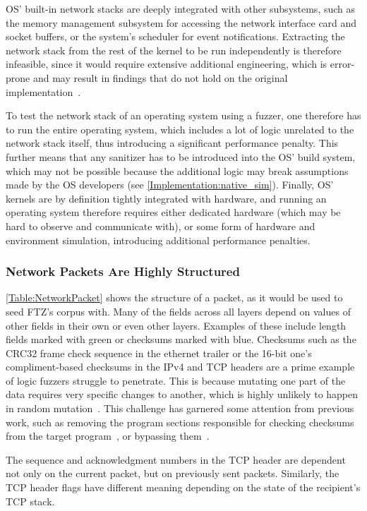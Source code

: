 \documentclass[twocolumn]{article}
\newcommand{\proj}{FTZ\xspace}
\let\savedCite=\cite
\renewcommand{\cite}{\unskip~\savedCite}
\begin{document}
OS' built-in network stacks are deeply integrated with other subsystems, such as the memory management subsystem for accessing the network interface card and socket buffers, or the system's scheduler for event notifications. Extracting the network stack from the rest of the kernel to be run independently is therefore infeasible, since it would require extensive additional engineering, which is error-prone and may result in findings that do not hold on the original implementation\cite{KernelVsUserNetworking}.

To test the network stack of an operating system using a fuzzer, one therefore has to run the entire operating system, which includes a lot of logic unrelated to the network stack itself, thus introducing a significant performance penalty. This further means that any sanitizer has to be introduced into the OS' build system, which may not be possible because the additional logic may break assumptions made by the OS developers (see \cref{Implementation:native_sim}). Finally, OS' kernels are by definition tightly integrated with hardware, and running an operating system therefore requires either dedicated hardware (which may be hard to observe and communicate with), or some form of hardware and environment simulation, introducing additional performance penalties.

\subsubsection{Network Packets Are Highly Structured}
\label{Background:TcpIsStructured}

\cref{Table:NetworkPacket} shows the structure of a packet, as it would be used to seed \proj's corpus with. Many of the fields across all layers depend on values of other fields in their own or even other layers. Examples of these include length fields marked with green or checksums marked with blue. Checksums such as the CRC32 frame check sequence in the ethernet trailer or the 16-bit one's compliment-based checksums in the IPv4 and TCP headers are a prime example of logic fuzzers struggle to penetrate. This is because mutating one part of the data requires very specific changes to another, which is highly unlikely to happen in random mutation\cite{StateOfTheArt}. This challenge has garnered some attention from previous work, such as removing the program sections responsible for checking checksums from the target program\cite{TFuzz}, or bypassing them\cite{REDQUEEN}.

The sequence and acknowledgment numbers in the TCP header are dependent not only on the current packet, but on previously sent packets. Similarly, the TCP header flags have different meaning depending on the state of the recipient's TCP stack.
\end{document}

